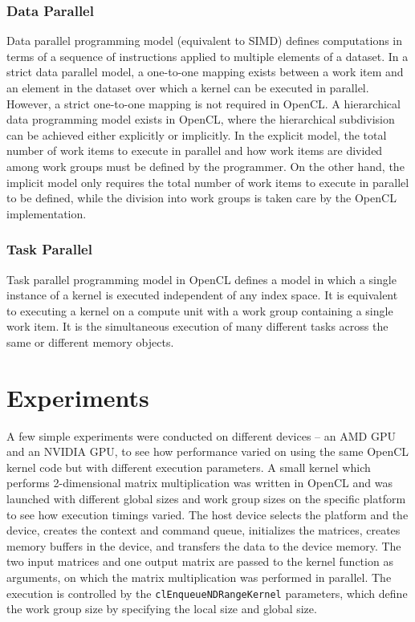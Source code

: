 \subsubsection{Data Parallel}
\label{sect4_1_4_1}
Data parallel programming model (equivalent to SIMD) defines computations in terms of a sequence of instructions applied to multiple elements of a dataset. In a strict data parallel model, a one-to-one mapping exists between a work item and an element in the dataset over which a kernel can be executed in parallel. However, a strict one-to-one mapping is not required in OpenCL. \newline\newline
A hierarchical data programming model exists in OpenCL, where the hierarchical subdivision can be achieved either explicitly or implicitly. In the explicit model, the total number of work items to execute in parallel and how work items are divided among work groups must be defined by the programmer. On the other hand, the implicit model only requires the total number of work items to execute in parallel to be defined, while the division into work groups is taken care by the OpenCL implementation.

\subsubsection{Task Parallel}
\label{sect4_1_4_2}
Task parallel programming model in OpenCL defines a model in which a single instance of a kernel is executed independent of any index space. It is equivalent to executing a kernel on a compute unit with a work group containing a single work item. It is the simultaneous execution of many different tasks across the same or different memory objects.

\section{Experiments}
\label{sect4_2}
A few simple experiments were conducted on different devices – an AMD GPU and an NVIDIA GPU, to see how performance varied on using the same OpenCL kernel code but with different execution parameters. A small kernel which performs 2-dimensional matrix multiplication was written in OpenCL and was launched with different global sizes and work group sizes on the specific platform to see how  execution timings varied. \newline\newline
The host device selects the platform and the device, creates the context and command queue, initializes the matrices, creates memory buffers in the device, and transfers the data to the device memory. The two input matrices and one output matrix are passed to the kernel function as arguments, on which the matrix multiplication was performed in parallel. The execution is controlled by the \verb|clEnqueueNDRangeKernel| parameters, which define the work group size by specifying the local size and global size. \newline\newline

